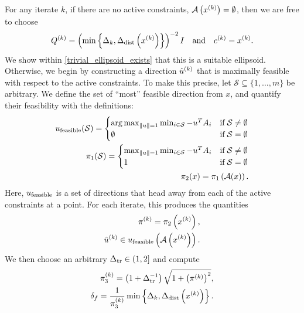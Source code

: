 \documentclass{article}
\begin{document}
For any iterate $k$, if there are no active constraints, ${\mathcal A}\left(x^{(k)}\right) = \emptyset$, then we are free to choose
\begin{align}
\label{define_linear_trivial_ellipse}
{Q^{(k)}} = \left(\min\left\{\Delta_k, \Delta_{\textrm{dist}}\left(x^{(k)}\right)\right\} \right)^{-2}I\quad \textrm{and} \quad c^{(k)} = x^{(k)}.
\end{align}
We show within \cref{trivial_ellipsoid_exists} that this is a suitable ellipsoid.
Otherwise, we begin by constructing a direction ${{{\hat u}^{(k)}}}$ that is maximally feasible with respect to the active constraints.
To make this precise, let $\mathcal S \subseteq \{1, \ldots, m\}$ be arbitrary.
We define the set of ``most'' feasible direction from $x$, and quantify their feasibility with the definitions:
\begin{align}
{u_{\textrm{feasible}}} (\mathcal S) = \begin{cases}
\operatorname*{arg\,max}_{\|u\| = 1} \min_{i \in \mathcal S} -u^T{{A}}_i & \text{if} \; \mathcal S \ne \emptyset \\
\emptyset & \text{if} \; \mathcal S = \emptyset
\end{cases} \label{define_alpha_one} \\
{\pi_1}(\mathcal S) = \begin{cases}
\max_{\|u\| = 1} \min_{i \in \mathcal S} -u^T{{A}}_i & \text{if} \; \mathcal S \ne \emptyset \\
1 & \text{if} \; \mathcal S = \emptyset
\end{cases} \label{define_alpha_two} \\
\pi_2(x) = {\pi_1}\left({\mathcal A}(x)\right). \label{define_alpha_three}
\end{align}
Here, ${u_{\textrm{feasible}}}$ is a set of directions that head away from each of the active constraints at a point.
For each iterate, this produces the quantities
\begin{align}
\pi^{(k)} =  \pi_2\left(x^{(k)}\right) \label{define_alpha_k}, \\
{{{\hat u}^{(k)}}} \in  {u_{\textrm{feasible}}}\left({\mathcal A}\left(x^{(k)}\right)\right). \label{define_u_k}
\end{align}
We then choose an arbitrary $\Delta_{\textrm{tr}} \in (1, 2]$ and compute
\begin{align}
\pi_3^{(k)}=\left(1 + \Delta_{\textrm{tr}}^{-1}\right)\sqrt{1+\left(\pi^{(k)}\right)^2}, \label{define_alphakp} \\
\delta_{f} = \frac 1 {\pi_3^{(k)}} \min\left\{\Delta_k,\Delta_{\textrm{dist}}\left(x^{(k)}\right) \right\}. \label{define_deltaf}
\end{align}
\end{document}
